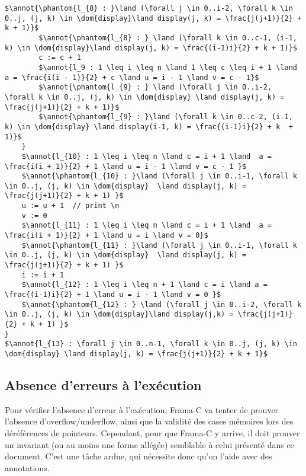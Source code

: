 \documentclass[a4paper, 11pt]{article}
\DeclareMathOperator{\ddom}{Dom}
\newcommand{\dom}[1]{\ddom\left(#1\right)}
\theoremstyle{mystyle}
\newcommand{\annot}[1]{{\color{black} #1}}
\begin{document}
\begin{lstlisting}[language=prooflang, mathescape,
    basicstyle=\ttfamily\large\color{blue!90!black},
    keywordstyle=\bfseries,
    tabsize=4]
        $\annot{\phantom{l_{8} : }\land (\forall j \in 0..i-2, \forall k \in 0..j, (j, k) \in \dom{display}\land display(j, k) = \frac{j(j+1)}{2} + k + 1)}$
        $\annot{\phantom{l_{8} : } \land (\forall k \in 0..c-1, (i-1, k) \in \dom{display}\land display(j, k) = \frac{(i-1)i}{2} + k + 1)}$
        c := c + 1
        $\annot{l_9 : 1 \leq i \leq n \land 1 \leq c \leq i + 1 \land a = \frac{i(i - 1)}{2} + c \land u = i - 1 \land v = c - 1}$
        $\annot{\phantom{l_{9} : } \land (\forall j \in 0..i-2, \forall k \in 0..j, (j, k) \in \dom{display} \land display(j, k) = \frac{j(j+1)}{2} + k + 1)}$
        $\annot{\phantom{l_{9} : }\land (\forall k \in 0..c-2, (i-1, k) \in \dom{display} \land display(i-1, k) = \frac{(i-1)i}{2} + k  + 1)}$
    }
    $\annot{l_{10} : 1 \leq i \leq n \land c = i + 1 \land  a = \frac{i(i + 1)}{2} + 1 \land u = i - 1 \land v = c - 1 }$
    $\annot{\phantom{l_{10} : }\land (\forall j \in 0..i-1, \forall k \in 0..j, (j, k) \in \dom{display}  \land display(j, k) = \frac{j(j+1)}{2} + k + 1) }$
    u := u + 1  // print \n
    v := 0
    $\annot{l_{11} : 1 \leq i \leq n \land c = i + 1 \land  a = \frac{i(i + 1)}{2} + 1 \land u = i \land v = 0}$
    $\annot{\phantom{l_{11} : }\land (\forall j \in 0..i-1, \forall k \in 0..j, (j, k) \in \dom{display}  \land display(j, k) = \frac{j(j+1)}{2} + k + 1) }$
    i := i + 1
    $\annot{l_{12} : 1 \leq i \leq n + 1 \land c = i \land a = \frac{(i-1)i}{2} + 1 \land u = i - 1 \land v = 0 }$
    $\annot{\phantom{l_{12} : } \land (\forall j \in 0..i-2, \forall k \in 0..j, (j, k) \in \dom{display}\land display(j,k) = \frac{j(j+1)}{2} + k + 1) }$
}
$\annot{l_{13} : \forall j \in 0..n-1, \forall k \in 0..j, (j, k) \in \dom{display} \land display(j, k) = \frac{j(j+1)}{2} + k + 1}$
\end{lstlisting}

\subsection{Absence d'erreurs à l'exécution}

Pour vérifier l'absence d'erreur à l'exécution, Frama-C va tenter de prouver l'absence d'overflow/underflow, ainsi que la validité des cases mémoires lors des déréférences de pointeurs. Cependant, pour que Frama-C y arrive, il doit prouver un invariant (ou au moins une forme allégée) semblable à celui présenté dans ce document. C'est une tâche ardue, qui nécessite donc qu'on l'aide avec des annotations.
\end{document}
